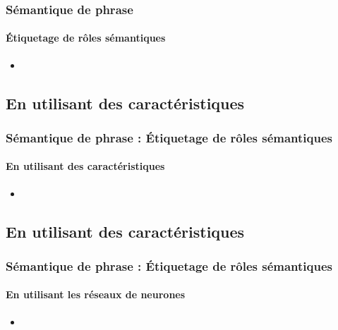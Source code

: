 \documentclass[xcolor=table]{beamer}
\begin{document}
\begin{frame}
	\frametitle{Sémantique de phrase}
	\framesubtitle{Étiquetage de rôles sémantiques}
	
	\begin{itemize}
		\item 
	\end{itemize}
	
\end{frame}

\subsection{En utilisant des caractéristiques}

\begin{frame}
	\frametitle{Sémantique de phrase : Étiquetage de rôles sémantiques}
	\framesubtitle{En utilisant des caractéristiques}
	
	\begin{itemize}
		\item 
	\end{itemize}
	
\end{frame}

\subsection{En utilisant des caractéristiques}

\begin{frame}
	\frametitle{Sémantique de phrase : Étiquetage de rôles sémantiques}
	\framesubtitle{En utilisant les réseaux de neurones}
	
	\begin{itemize}
		\item 
	\end{itemize}
	
\end{frame}

\end{document}
